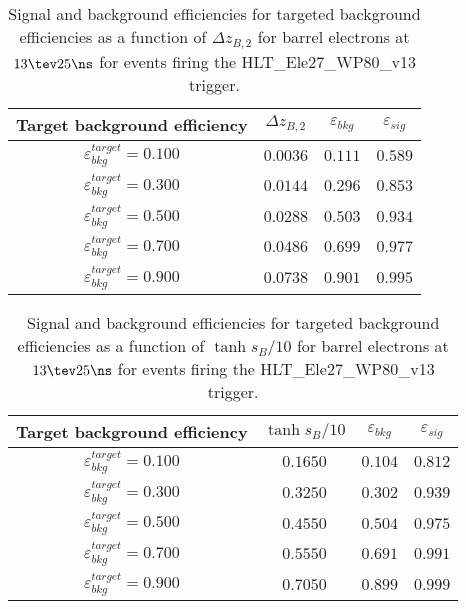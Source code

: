 \clearpage

\begin{table}[!bht]
  \begin{center}
    \begin{tabular}{cccc}
      \hline
      Target background efficiency & $\Delta z_{B,2}$ & $\varepsilon_{bkg}$ & $\varepsilon_{sig}$ \\ 
      \hline
      $\varepsilon_{bkg}^{target} = 0.100$ & $  0.0036$ & $0.111$ & $0.589$ \\
      $\varepsilon_{bkg}^{target} = 0.300$ & $  0.0144$ & $0.296$ & $0.853$ \\
      $\varepsilon_{bkg}^{target} = 0.500$ & $  0.0288$ & $0.503$ & $0.934$ \\
      $\varepsilon_{bkg}^{target} = 0.700$ & $  0.0486$ & $0.699$ & $0.977$ \\
      $\varepsilon_{bkg}^{target} = 0.900$ & $  0.0738$ & $0.901$ & $0.995$ \\
      \hline
    \end{tabular}
    \caption{Signal and background efficiencies for targeted background efficiencies as a function of $\Delta z_{B,2}$ for barrel electrons at $13\tev 25\ns$ for events firing the HLT\_Ele27\_WP80\_v13 trigger.}
    \label{tab:eff_rej_z2B_beam_13_25_trigger_27_B}
  \end{center}
\end{table}

\clearpage

\begin{table}[!bht]
  \begin{center}
    \begin{tabular}{cccc}
      \hline
      Target background efficiency & $\tanh{s_B/10}$ & $\varepsilon_{bkg}$ & $\varepsilon_{sig}$ \\ 
      \hline
      $\varepsilon_{bkg}^{target} = 0.100$ & $  0.1650$ & $0.104$ & $0.812$ \\
      $\varepsilon_{bkg}^{target} = 0.300$ & $  0.3250$ & $0.302$ & $0.939$ \\
      $\varepsilon_{bkg}^{target} = 0.500$ & $  0.4550$ & $0.504$ & $0.975$ \\
      $\varepsilon_{bkg}^{target} = 0.700$ & $  0.5550$ & $0.691$ & $0.991$ \\
      $\varepsilon_{bkg}^{target} = 0.900$ & $  0.7050$ & $0.899$ & $0.999$ \\
      \hline
    \end{tabular}
    \caption{Signal and background efficiencies for targeted background efficiencies as a function of $\tanh{s_B/10}$ for barrel electrons at $13\tev 25\ns$ for events firing the HLT\_Ele27\_WP80\_v13 trigger.}
    \label{tab:eff_rej_sB_beam_13_25_trigger_27_B}
  \end{center}
\end{table}


